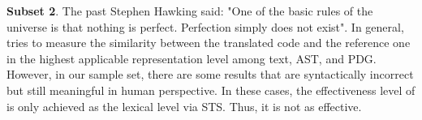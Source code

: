 \textbf{Subset 2}. The past Stephen Hawking said: "One of the basic rules of the universe is that nothing is perfect. Perfection simply does not exist". In general, {\model} tries to measure the
similarity between the translated code and the reference one in the
highest applicable representation level among text, AST, and
PDG. However, in our sample set, there are some results that are
syntactically incorrect but still meaningful in human perspective. In
these cases, the effectiveness level of {\model} is only achieved as
the lexical level via STS. Thus, it is not as effective.



